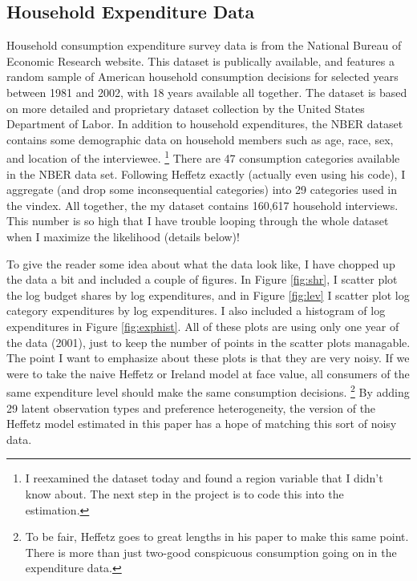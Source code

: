 \documentclass{article}
\begin{document}
\subsection{Household Expenditure Data}
Household consumption expenditure survey  data is from the National Bureau of Economic Research website.    
This dataset is publically available, and features a random sample of American household consumption decisions for selected years between 1981 and 2002, with 18 years available all together.  
The dataset is based on more detailed and proprietary dataset collection by the United States Department of Labor. 
In addition to household expenditures, the NBER dataset contains some demographic data on household members such as age, race, sex, and location of the interviewee.  
\footnote{I reexamined the dataset today and found a region variable that I didn't know about.  The next step in the project is to code this into the estimation.}
There are 47 consumption categories available in the NBER data set.
Following Heffetz exactly (actually even using his code), I aggregate (and drop some inconsequential categories) into 29 categories used in the vindex.
All together, the my dataset contains 160,617 household interviews.
This number is so high that I have trouble looping through the whole dataset when I maximize the likelihood (details below)!

To give the reader some idea about what the data look like, I have chopped up the data a bit and included a couple of figures.  
In Figure \ref{fig:shr}, I scatter plot the log budget shares by log expenditures, and in Figure \ref{fig:lev} I scatter plot log category expenditures by log expenditures.  
I also included a histogram of log expenditures in Figure \ref{fig:exphist}.  
All of these plots are using only one year of the data (2001), just to keep the number of points in the scatter plots managable. 
The point I want to emphasize about these plots is that they are very noisy.
If we were to take the naive Heffetz or Ireland model at face value, all consumers of the same expenditure level should make the same consumption decisions.
\footnote{To be fair, Heffetz goes to great lengths in his paper to make this same point.  There is more than just two-good conspicuous consumption going on in the expenditure data.}
By adding 29 latent observation types and preference heterogeneity, the version of the Heffetz model estimated in this paper has a hope of matching this sort of noisy data.
\end{document}
